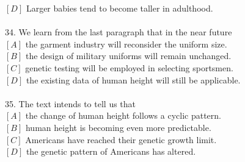\documentclass[a4paper]{ctexart}
\begin{document}
$[D]$ Larger babies tend to become taller in adulthood.\\
\\
34.	We learn from the last paragraph that in the near future\\
$[A]$ the garment industry will reconsider the uniform size.\\
$[B]$ the design of military uniforms will remain unchanged.\\
$[C]$ genetic testing will be employed in selecting sportsmen.\\
$[D]$ the existing data of human height will still be applicable.\\
\\
35.	The text intends to tell us that\\
$[A]$ the change of human height follows a cyclic pattern.\\
$[B]$ human height is becoming even more predictable.\\
$[C]$ Americans have reached their genetic growth limit.\\
$[D]$ the genetic pattern of Americans has altered.\\
\end{document}
